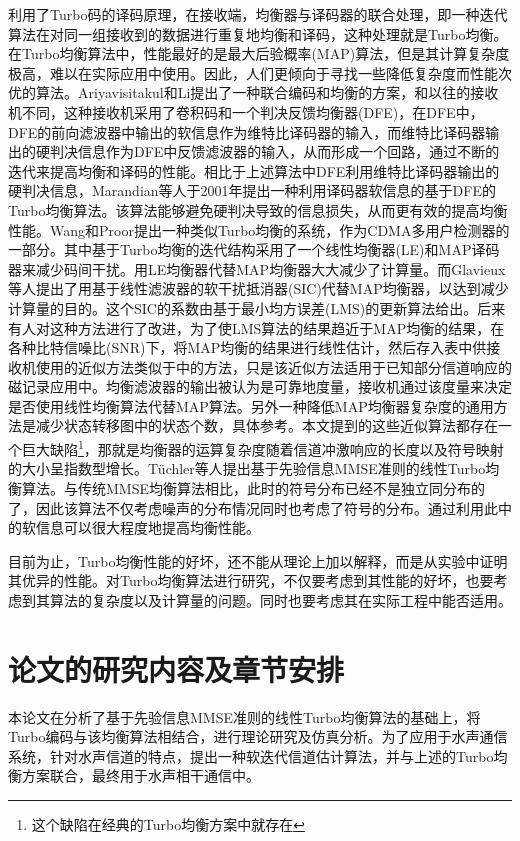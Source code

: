 利用了Turbo码的译码原理，在接收端，均衡器与译码器的联合处理，即一种迭代算法在对同一组接收到的数据进行重复地均衡和译码，这种处理就是Turbo均衡\citep{douillard1995,Anastasopoulos1997}。
在Turbo均衡算法中，性能最好的是最大后验概率(MAP)算法\citep{Davis2001}，但是其计算复杂度极高，难以在实际应用中使用。因此，人们更倾向于寻找一些降低复杂度而性能次优的算法。Ariyavisitakul和Li\citep{ariyavisitakul1998}提出了一种联合编码和均衡的方案，和以往的接收机不同，这种接收机采用了卷积码和一个判决反馈均衡器(DFE)，在DFE中，DFE的前向滤波器中输出的软信息作为维特比译码器的输入，而维特比译码器输出的硬判决信息作为DFE中反馈滤波器的输入，从而形成一个回路，通过不断的迭代来提高均衡和译码的性能。相比于上述算法中DFE利用维特比译码器\citep{Joachim1989}输出的硬判决信息，Marandian等人\citep{Marandian}于2001年提出一种利用译码器软信息的基于DFE的Turbo均衡算法。该算法能够避免硬判决导致的信息损失，从而更有效的提高均衡性能。Wang和Proor\citep{wang1999iterative}提出一种类似Turbo均衡的系统，作为CDMA多用户检测器的一部分。其中基于Turbo均衡的迭代结构采用了一个线性均衡器(LE)和MAP译码器来减少码间干扰。用LE均衡器代替MAP均衡器大大减少了计算量。而Glavieux\citep{glavieux1997turbo}等人提出了用基于线性滤波器的软干扰抵消器(SIC)代替MAP均衡器，以达到减少计算量的目的。这个SIC的系数由基于最小均方误差(LMS)的更新算法给出。后来有人对这种方法进行了改进，为了使LMS算法的结果趋近于MAP均衡的结果，在各种比特信噪比(SNR)下，将MAP均衡的结果进行线性估计，然后存入表中供接收机使用\citep{raphaeli2000,wu2000turbo}的近似方法类似于\citep{glavieux1997turbo}中的方法，只是该近似方法适用于已知部分信道响应的磁记录应用中。均衡滤波器的输出被认为是可靠地度量，接收机通过该度量来决定是否使用线性均衡算法代替MAP算法。另外一种降低MAP均衡器复杂度的通用方法是减少状态转移图中的状态个数，具体参考。本文提到的这些近似算法都存在一个巨大缺陷\footnote{这个缺陷在经典的Turbo均衡方案中就存在}，那就是均衡器的运算复杂度随着信道冲激响应的长度以及符号映射的大小呈指数型增长。T{\"u}chler\citep{Tuchler2002a,Tuchler,Tuchler2011}等人提出基于先验信息MMSE准则的线性Turbo均衡算法。与传统MMSE均衡算法相比，此时的符号分布已经不是独立同分布的了，因此该算法不仅考虑噪声的分布情况同时也考虑了符号的分布。通过利用此中的软信息可以很大程度地提高均衡性能。

目前为止，Turbo均衡性能的好坏，还不能从理论上加以解释，而是从实验中证明其优异的性能。对Turbo均衡算法进行研究，不仅要考虑到其性能的好坏，也要考虑到其算法的复杂度以及计算量的问题。同时也要考虑其在实际工程中能否适用。
\section{论文的研究内容及章节安排}
本论文在分析了基于先验信息MMSE准则的线性Turbo均衡算法的基础上，将Turbo编码与该均衡算法相结合，进行理论研究及仿真分析。为了应用于水声通信系统，针对水声信道的特点，提出一种软迭代信道估计算法，并与上述的Turbo均衡方案联合，最终用于水声相干通信中。


